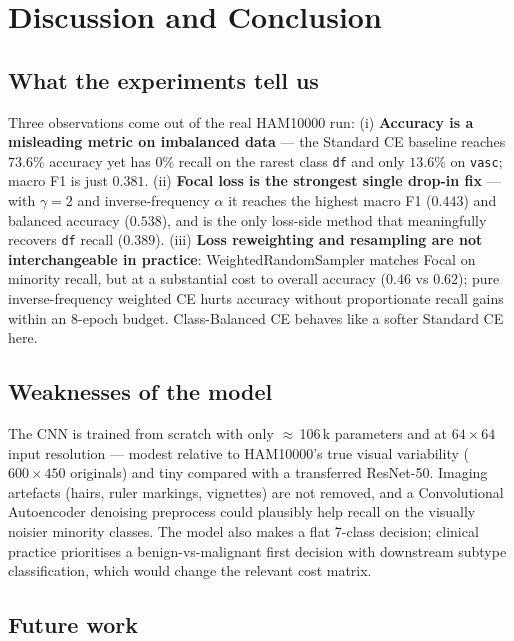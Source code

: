 \documentclass[11pt,a4paper]{article}
\theoremstyle{definition}
\begin{document}
\section{Discussion and Conclusion}

\subsection{What the experiments tell us}

\begin{insightbox}
Three observations come out of the real HAM10000 run:
(i) \textbf{Accuracy is a misleading metric on imbalanced data} --- the
Standard CE baseline reaches $73.6\%$ accuracy yet has $0\%$ recall on the
rarest class \texttt{df} and only $13.6\%$ on \texttt{vasc}; macro F1 is
just $0.381$.
(ii) \textbf{Focal loss is the strongest single drop-in fix} --- with
$\gamma{=}2$ and inverse-frequency $\alpha$ it reaches the highest macro F1
($0.443$) and balanced accuracy ($0.538$), and is the only loss-side method
that meaningfully recovers \texttt{df} recall ($0.389$).
(iii) \textbf{Loss reweighting and resampling are not interchangeable in
practice}: WeightedRandomSampler matches Focal on minority recall, but at a
substantial cost to overall accuracy ($0.46$ vs $0.62$); pure inverse-frequency
weighted CE hurts accuracy without proportionate recall gains within an 8-epoch
budget. Class-Balanced CE behaves like a softer Standard CE here.
\end{insightbox}

\subsection{Weaknesses of the model}

The CNN is trained from scratch with only $\approx$\,106\,k parameters and at
$64{\times}64$ input resolution --- modest relative to HAM10000's true visual
variability ($600{\times}450$ originals) and tiny compared with a transferred
ResNet-50. Imaging artefacts (hairs, ruler markings, vignettes) are not
removed, and a Convolutional Autoencoder denoising preprocess could plausibly
help recall on the visually noisier minority classes. The model also makes a
flat 7-class decision; clinical practice prioritises a benign-vs-malignant
first decision with downstream subtype classification, which would change the
relevant cost matrix.

\subsection{Future work}
\end{document}
